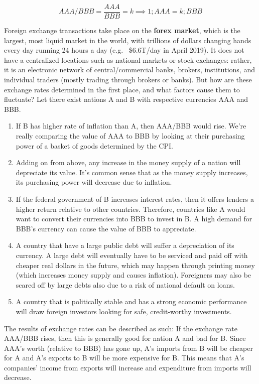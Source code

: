\documentclass{article}
\begin{document}
    \begin{equation}
      AAA/BBB = \frac{AAA}{BBB} = k \implies 1 ; AAA = k ; BBB
    \end{equation}

    Foreign exchange transactions take place on the \textbf{forex market}, which is the largest, most liquid market in the world, with trillions of dollars changing hands every day running 24 hours a day (e.g. ~\$6.6T/day in April 2019). It does not have a centralized locations such as national markets or stock exchanges: rather, it is an electronic network of central/commercial banks, brokers, institutions, and individual traders (mostly trading through brokers or banks).
    But how are these exchange rates determined in the first place, and what factors cause them to fluctuate? Let there exist nations A and B with respective currencies AAA and BBB.

    \begin{enumerate}
      \item If B has higher rate of inflation than A, then AAA/BBB would rise. We're really comparing the value of AAA to BBB by looking at their purchasing power of a basket of goods determined by the CPI.
      \item Adding on from above, any increase in the money supply of a nation will depreciate its value. It's common sense that as the money supply increases, its purchasing power will decrease due to inflation.
      \item If the federal government of B increases interest rates, then it offers lenders a higher return relative to other countries. Therefore, countries like A would want to convert their currencies into BBB to invest in B. A high demand for BBB's currency can cause the value of BBB to appreciate.
      \item A country that have a large public debt will suffer a depreciation of its currency. A large debt will eventually have to be serviced and paid off with cheaper real dollars in the future, which may happen through printing money (which increases money supply and causes inflation). Foreigners may also be scared off by large debts also due to a risk of national default on loans.
      \item A country that is politically stable and has a strong economic performance will draw foreign investors looking for safe, credit-worthy investments.
    \end{enumerate}

    The results of exchange rates can be described as such: If the exchange rate AAA/BBB rises, then this is generally good for nation A and bad for B. Since AAA's worth (relative to BBB) has gone up, A's imports from B will be cheaper for A and A's exports to B will be more expensive for B. This means that A's companies' income from exports will increase and expenditure from imports will decrease.
\end{document}
